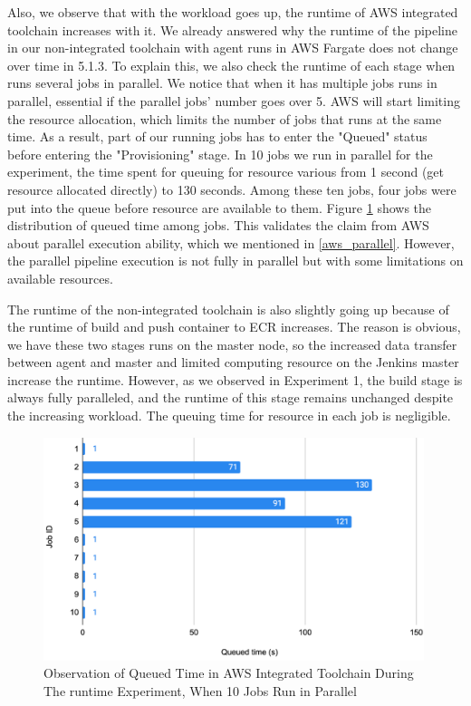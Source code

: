  \par
 Also, we observe that with the workload goes up, the runtime of AWS integrated toolchain increases with it. We already answered why the runtime of the pipeline in our non-integrated toolchain with agent runs in AWS Fargate does not change over time in 5.1.3. To explain this, we also check the runtime of each stage when runs several jobs in parallel. We notice that when it has multiple jobs runs in parallel, essential if the parallel jobs' number goes over 5. AWS will start limiting the resource allocation, which limits the number of jobs that runs at the same time. As a result, part of our running jobs has to enter the "Queued" status before entering the "Provisioning" stage. In 10 jobs we run in parallel for the experiment, the time spent for queuing for resource various from 1 second (get resource allocated directly) to 130 seconds. Among these ten jobs, four jobs were put into the queue before resource are available to them. Figure \ref{fig:queued} shows the distribution of queued time among jobs. This validates the claim from AWS about parallel execution ability, which we mentioned in \ref{aws_parallel}. However, the parallel pipeline execution is not fully in parallel but with some limitations on available resources.
 \par
 The runtime of the non-integrated toolchain is also slightly going up because of the runtime of build and push container to ECR increases. The reason is obvious, we have these two stages runs on the master node, so the increased data transfer between agent and master and limited computing resource on the Jenkins master increase the runtime. However, as we observed in Experiment 1, the build stage is always fully paralleled, and the runtime of this stage remains unchanged despite the increasing workload. The queuing time for resource in each job is negligible.
 \begin{figure}[h]
    \centering
    \includegraphics[width=0.99\textwidth]{pics/queued_time.png}
    \caption{Observation of Queued Time in AWS Integrated Toolchain During The runtime Experiment, When 10 Jobs Run in Parallel}
    \label{fig:queued}
    \end{figure}
